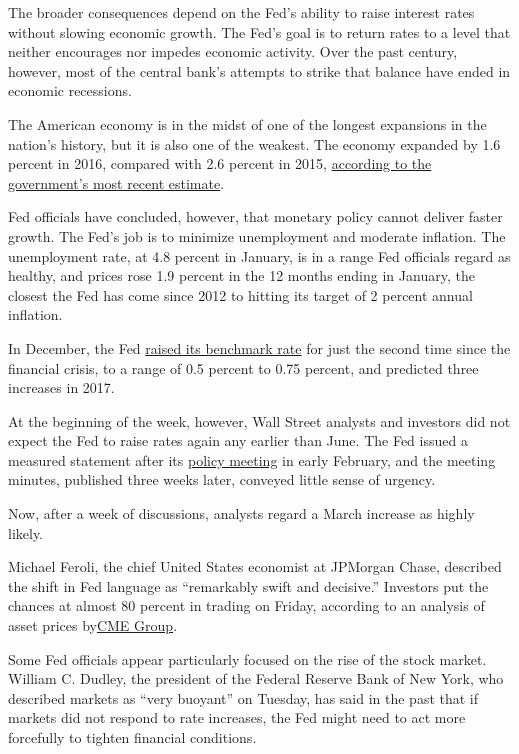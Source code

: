 The broader consequences depend on the Fed's ability to raise interest
rates without slowing economic growth. The Fed's goal is to return rates
to a level that neither encourages nor impedes economic activity. Over
the past century, however, most of the central bank's attempts to strike
that balance have ended in economic recessions.

The American economy is in the midst of one of the longest expansions in
the nation's history, but it is also one of the weakest. The economy
expanded by 1.6 percent in 2016, compared with 2.6 percent in 2015,
\href{https://www.bea.gov/newsreleases/national/gdp/gdpnewsrelease.htm}{according
to the government's most recent estimate}.

Fed officials have concluded, however, that monetary policy cannot
deliver faster growth. The Fed's job is to minimize unemployment and
moderate inflation. The unemployment rate, at 4.8 percent in January, is
in a range Fed officials regard as healthy, and prices rose 1.9 percent
in the 12 months ending in January, the closest the Fed has come since
2012 to hitting its target of 2 percent annual inflation.

In December, the Fed
\href{https://www.nytimes.com/2016/12/14/business/economy/fed-interest-rates-janet-yellen.html}{raised
its benchmark rate} for just the second time since the financial crisis,
to a range of 0.5 percent to 0.75 percent, and predicted three increases
in 2017.

At the beginning of the week, however, Wall Street analysts and
investors did not expect the Fed to raise rates again any earlier than
June. The Fed issued a measured statement after its
\href{https://www.nytimes.com/2017/02/01/business/economy/fed-interest-rates-trump-yellen.html}{policy
meeting} in early February, and the meeting minutes, published three
weeks later, conveyed little sense of urgency.

Now, after a week of discussions, analysts regard a March increase as
highly likely.

Michael Feroli, the chief United States economist at JPMorgan Chase,
described the shift in Fed language as ``remarkably swift and
decisive.'' Investors put the chances at almost 80 percent in trading on
Friday, according to an analysis of asset prices
by\href{https://www.cmegroup.com/}{CME Group}.

Some Fed officials appear particularly focused on the rise of the stock
market. William C. Dudley, the president of the Federal Reserve Bank of
New York, who described markets as ``very buoyant'' on Tuesday, has said
in the past that if markets did not respond to rate increases, the Fed
might need to act more forcefully to tighten financial conditions.

